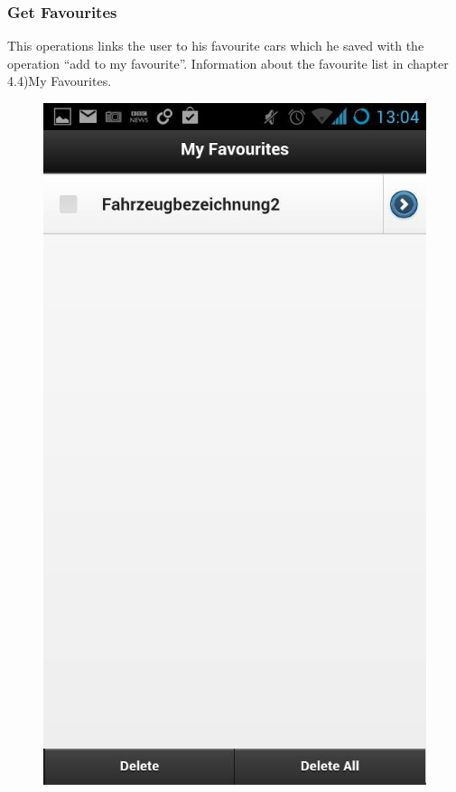\subsubsection{Get Favourites}
This operations links the user to his favourite cars which he saved with the operation “add to my favourite”. Information about the favourite list in chapter 4.4)My Favourites.
\\
\begin{figure}[h]
\centering
\includegraphics[width=0.5\linewidth]{graphics/chapter4/10}
\caption{}
\label{fig:11}
\end{figure}
\newpage

